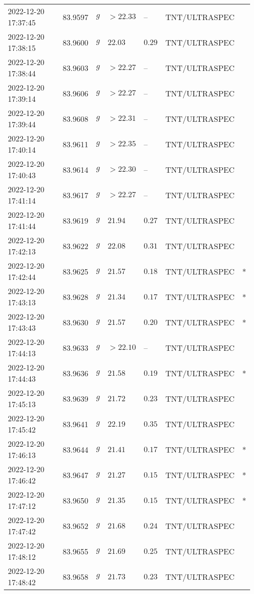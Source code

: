 \documentclass{nature_plusfigure}
\begin{document}
\begin{supplement}
\begin{center}
\begin{longtable}{lllllll}
2022-12-20 17:37:45 & 83.9597 & $g$ & $>22.33$ & -- & TNT/ULTRASPEC &  \\ 
2022-12-20 17:38:15 & 83.9600 & $g$ & $22.03$ & $0.29$ & TNT/ULTRASPEC &  \\ 
2022-12-20 17:38:44 & 83.9603 & $g$ & $>22.27$ & -- & TNT/ULTRASPEC &  \\ 
2022-12-20 17:39:14 & 83.9606 & $g$ & $>22.27$ & -- & TNT/ULTRASPEC &  \\ 
2022-12-20 17:39:44 & 83.9608 & $g$ & $>22.31$ & -- & TNT/ULTRASPEC &  \\ 
2022-12-20 17:40:14 & 83.9611 & $g$ & $>22.35$ & -- & TNT/ULTRASPEC &  \\ 
2022-12-20 17:40:43 & 83.9614 & $g$ & $>22.30$ & -- & TNT/ULTRASPEC &  \\ 
2022-12-20 17:41:14 & 83.9617 & $g$ & $>22.27$ & -- & TNT/ULTRASPEC &  \\ 
2022-12-20 17:41:44 & 83.9619 & $g$ & $21.94$ & $0.27$ & TNT/ULTRASPEC &  \\ 
2022-12-20 17:42:13 & 83.9622 & $g$ & $22.08$ & $0.31$ & TNT/ULTRASPEC &  \\ 
2022-12-20 17:42:44 & 83.9625 & $g$ & $21.57$ & $0.18$ & TNT/ULTRASPEC & * \\ 
2022-12-20 17:43:13 & 83.9628 & $g$ & $21.34$ & $0.17$ & TNT/ULTRASPEC & * \\ 
2022-12-20 17:43:43 & 83.9630 & $g$ & $21.57$ & $0.20$ & TNT/ULTRASPEC & * \\ 
2022-12-20 17:44:13 & 83.9633 & $g$ & $>22.10$ & -- & TNT/ULTRASPEC &  \\ 
2022-12-20 17:44:43 & 83.9636 & $g$ & $21.58$ & $0.19$ & TNT/ULTRASPEC & * \\ 
2022-12-20 17:45:13 & 83.9639 & $g$ & $21.72$ & $0.23$ & TNT/ULTRASPEC &  \\ 
2022-12-20 17:45:42 & 83.9641 & $g$ & $22.19$ & $0.35$ & TNT/ULTRASPEC &  \\ 
2022-12-20 17:46:13 & 83.9644 & $g$ & $21.41$ & $0.17$ & TNT/ULTRASPEC & * \\ 
2022-12-20 17:46:42 & 83.9647 & $g$ & $21.27$ & $0.15$ & TNT/ULTRASPEC & * \\ 
2022-12-20 17:47:12 & 83.9650 & $g$ & $21.35$ & $0.15$ & TNT/ULTRASPEC & * \\ 
2022-12-20 17:47:42 & 83.9652 & $g$ & $21.68$ & $0.24$ & TNT/ULTRASPEC &  \\ 
2022-12-20 17:48:12 & 83.9655 & $g$ & $21.69$ & $0.25$ & TNT/ULTRASPEC &  \\ 
2022-12-20 17:48:42 & 83.9658 & $g$ & $21.73$ & $0.23$ & TNT/ULTRASPEC &  \\ 

\end{longtable}
\end{center}
\end{supplement}
\end{document}
